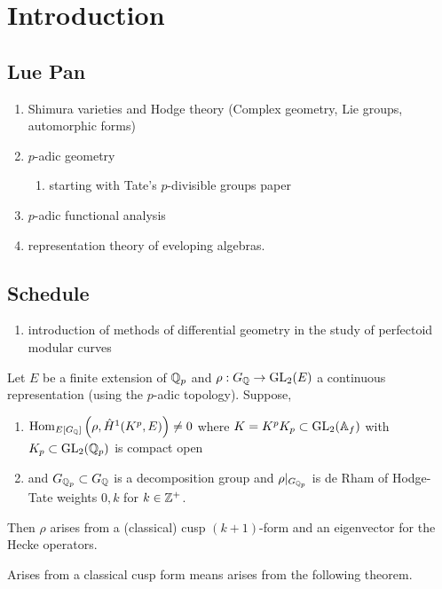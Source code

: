 \documentclass[12pt]{article}
\begin{document}
\section{Introduction}

\subsection{Lue Pan}

\begin{enumerate}
\item Shimura varieties and Hodge theory (Complex geometry, Lie groups, automorphic forms)
\item $p$-adic geometry
\begin{enumerate}
\item starting with Tate's $p$-divisible groups paper
\end{enumerate}
\item $p$-adic functional analysis
\item representation theory of eveloping algebras.
\end{enumerate}

\subsection{Schedule}

\begin{enumerate}
\item introduction of methods of differential geometry in the study of perfectoid modular curves
\end{enumerate}

\begin{theorem}[Pan, 2022]
Let $E$ be a finite extension of $\mathbb{Q}_p$ and $\rho : G_{\mathbb{Q}} \to \mathrm{GL}_2(E)$ a continuous representation (using the $p$-adic topology). Suppose,
\begin{enumerate}
\item $\mathrm{Hom}_{E[G_{\mathbb{Q}}]} \left( \rho, \hat{H}^1(K^p, E) \right) \neq 0$ where $K = K^p K_p \subset \mathrm{GL}_2(\mathbb{A}_f)$ with $K_p \subset \mathrm{GL}_2(\mathbb{Q}_p)$ is compact open 
\item and $G_{\mathbb{Q}_p} \subset G_{\mathbb{Q}}$ is a decomposition group and $\rho|_{G_{\mathbb{Q}_p}}$ is de Rham of Hodge-Tate weights $0,k$ for $k \in \mathbb{Z}^+$.  
\end{enumerate}
Then $\rho$ arises from a (classical) cusp $(k+1)$-form and an eigenvector for the Hecke operators.
\end{theorem}

\begin{rmk}
Arises from a classical cusp form means arises from the following theorem.
\end{rmk}
\end{document}
